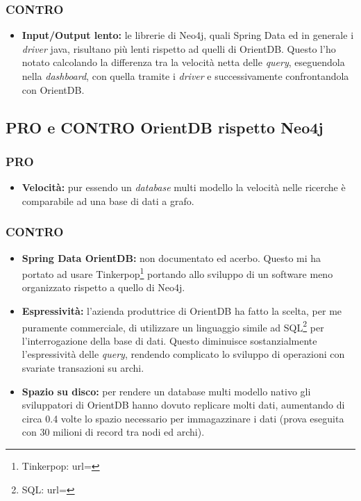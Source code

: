 \subsubsection{CONTRO}
\begin{itemize}
\item{\textbf{Input/Output lento:}} le librerie di Neo4j, quali Spring Data ed in generale i \textit{driver} java, risultano più lenti rispetto ad quelli di OrientDB. Questo l'ho notato calcolando la differenza tra la velocità netta delle \textit{query}, eseguendola nella \textit{dashboard}, con quella tramite i \textit{driver} e successivamente confrontandola con OrientDB.
\end{itemize}
\subsection{PRO e CONTRO OrientDB rispetto Neo4j}
\subsubsection{PRO}
\begin{itemize}
\item{\textbf{Velocità:}} pur essendo un \textit{database} multi modello la velocità nelle ricerche è comparabile ad una base di dati a grafo.
\end{itemize}
\subsubsection{CONTRO}
\begin{itemize}
\item{\textbf{Spring Data OrientDB:}} non documentato ed acerbo. Questo mi ha portato ad usare Tinkerpop\footnote{Tinkerpop: url= } portando allo sviluppo di un software meno organizzato rispetto a quello di Neo4j.
\item{\textbf{Espressività:}} l'azienda produttrice di OrientDB ha fatto la scelta, per me puramente commerciale, di utilizzare un linguaggio simile ad SQL\footnote{SQL: url= } per l'interrogazione della base di dati. Questo diminuisce sostanzialmente l'espressività delle \textit{query}, rendendo complicato lo sviluppo di operazioni con svariate transazioni su archi.
\item{\textbf{Spazio su disco:}} per rendere un database multi modello nativo gli sviluppatori di OrientDB hanno dovuto replicare molti dati, aumentando di circa 0.4 volte lo spazio necessario per immagazzinare i dati (prova eseguita con 30 milioni di record tra nodi ed archi).
\end{itemize}

